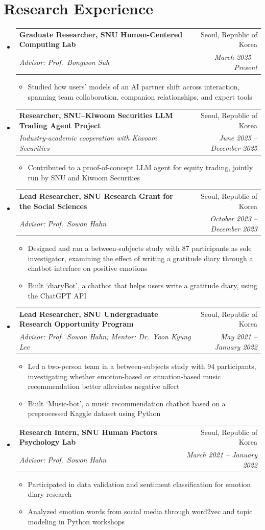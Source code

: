 \documentclass[letterpaper,10pt]{article}
\makeatletter
\newcommand{\ENTRYSEP}{0.4em}\newcommand{\PLAINSEP}{0.3em}
\newcommand{\DETSEP}{0.14em}\newcommand{\TOPSEP}{0.35em}
\newcommand{\ENTRYDROP}{-0.15em}
\newcommand{\ENTRYSEP}{0.18em}\newcommand{\PLAINSEP}{0.15em}
\newcommand{\DETSEP}{0.06em}\newcommand{\TOPSEP}{0.18em}
\newcommand{\ENTRYDROP}{-0.35em}
\let\oldsection\section
\renewcommand{\section}[1]{\needspace{8\baselineskip}\oldsection{#1}}
\newcommand{\entry}[4]{%
  \needspace{3.2\baselineskip}\item
  \begin{tabularx}{\linewidth}[t]{@{}>{\raggedright\arraybackslash}X@{\hspace{1.2em}}r@{}}
    \textbf{#1} & #2 \\[0.05em]
    \textit{\small #3} & \textit{\small #4} \\
  \end{tabularx}\vspace{\ENTRYDROP}%
}
\newenvironment{entries}
  {\begin{itemize}[leftmargin=1.2em, itemsep=\ENTRYSEP, parsep=0pt, topsep=\TOPSEP]}
  {\end{itemize}}
\newenvironment{details}
  {\begin{itemize}[label=$\circ$, leftmargin=1.4em, itemsep=\DETSEP, parsep=0pt, topsep=\TOPSEP]}
  {\end{itemize}\vspace{-0.2em}}
\makeatother
\begin{document}
\section{Research Experience}
\begin{entries}
  \entry{Graduate Researcher, SNU Human-Centered Computing Lab}{Seoul, Republic of Korea}
        {Advisor: Prof.\ Bongwon Suh}{March 2025 -- Present}
  \begin{details}
    \item Studied how users' models of an AI partner shift across interaction, spanning team
          collaboration, companion relationships, and expert tools
  \end{details}

  \entry{Researcher, SNU--Kiwoom Securities LLM Trading Agent Project}{Seoul, Republic of Korea}
        {Industry-academic cooperation with Kiwoom Securities}{June 2025 -- December 2025}
  \begin{details}
    \item Contributed to a proof-of-concept LLM agent for equity trading, jointly run by SNU
          and Kiwoom Securities
  \end{details}

  \entry{Lead Researcher, SNU Research Grant for the Social Sciences}{Seoul, Republic of Korea}
        {Advisor: Prof.\ Sowon Hahn}{October 2023 -- December 2023}
  \begin{details}
    \item Designed and ran a between-subjects study with 87 participants as sole investigator, examining the effect of writing a gratitude diary through a chatbot interface on positive emotions
    \item Built `diaryBot', a chatbot that helps users write a gratitude diary, using the ChatGPT API
  \end{details}

  \entry{Lead Researcher, SNU Undergraduate Research Opportunity Program}{Seoul, Republic of Korea}
        {Advisor: Prof.\ Sowon Hahn; Mentor: Dr.\ Yoon Kyung Lee}{May 2021 -- January 2022}
  \begin{details}
    \item Led a two-person team in a between-subjects study with 94 participants, investigating whether emotion-based or situation-based music recommendation better alleviates negative affect
    \item Built `Music-bot', a music recommendation chatbot based on a preprocessed Kaggle
          dataset using Python
  \end{details}

  \entry{Research Intern, SNU Human Factors Psychology Lab}{Seoul, Republic of Korea}
        {Advisor: Prof.\ Sowon Hahn}{March 2021 -- January 2022}
  \begin{details}
    \item Participated in data validation and sentiment classification for emotion diary research
    \item Analyzed emotion words from social media through word2vec and topic modeling in
          Python workshops
  \end{details}
\end{entries}
\end{document}
